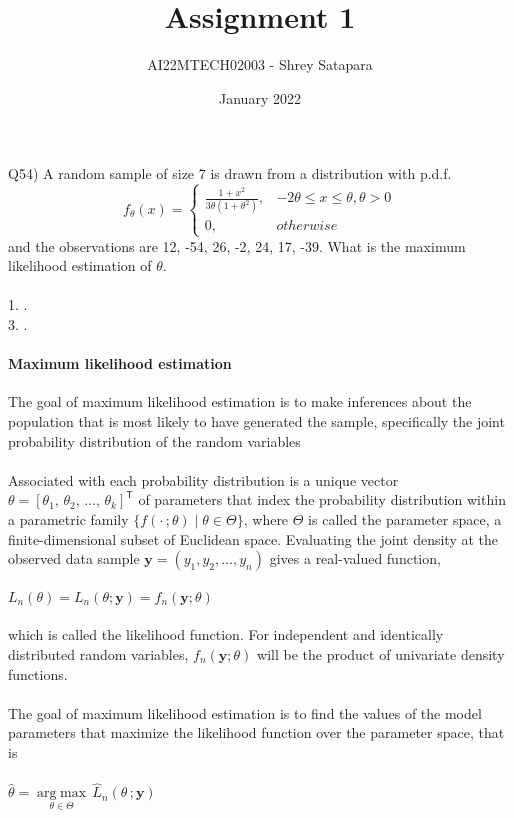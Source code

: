 \documentclass{article}
\title{Assignment 1}
\author{AI22MTECH02003 - Shrey Satapara}
\date{January 2022}
\begin{document}
\maketitle

\paragraph{}
Q54) A random sample of size 7 is drawn from a distribution with p.d.f. \\ 
\[
    f_\theta(x)= 
\begin{cases}
\frac{1 + x^2}{3\theta(1+\theta^2)},& -2\theta \leq x \leq \theta, \theta > 0\\
    0,              & otherwise
\end{cases}
\]
and the observations are 12, -54, 26, -2, 24, 17, -39. What is the maximum likelihood estimation of \(\theta\).
\\\\
1. \quad \quad \quad {}. \\ 3. \quad \quad \quad {}.


\paragraph{Maximum likelihood estimation}The goal of maximum likelihood estimation is to make inferences about the population that is most likely to have generated the sample, specifically the joint probability distribution of the random variables
\paragraph{}
Associated with each probability distribution is a unique vector \( \theta =\left[\theta _{1},\,\theta _{2},\,\ldots ,\,\theta _{k}\right]^{\mathsf {T}}\) of parameters that index the probability distribution within a parametric family \( \{f(\cdot \,;\theta )\mid \theta \in \Theta \}\), where \( \Theta \)  is called the parameter space, a finite-dimensional subset of Euclidean space. Evaluating the joint density at the observed data sample \( \mathbf {y} =(y_{1},y_{2},\ldots ,y_{n})\) gives a real-valued function,
\\\\
\({\displaystyle L_{n}(\theta )=L_{n}(\theta ;\mathbf {y} )=f_{n}(\mathbf {y} ;\theta )}\)
\paragraph{}
which is called the likelihood function. For independent and identically distributed random variables, \( f_{n}(\mathbf {y} ;\theta )\)  will be the product of univariate density functions.
\\\\
The goal of maximum likelihood estimation is to find the values of the model parameters that maximize the likelihood function over the parameter space, that is
\\\\
\({\hat {\theta }}={\underset {\theta \in \Theta }{\operatorname {arg\;max} }}\,{\widehat {L}}_{n}(\theta \,;\mathbf {y} )\)
\end{document}
